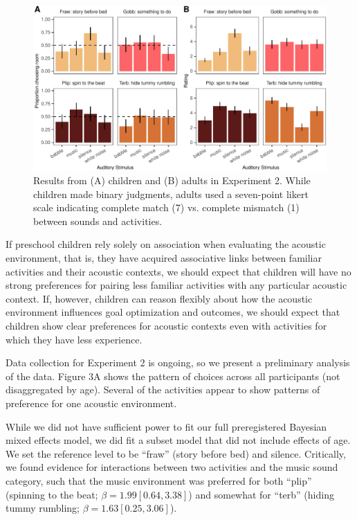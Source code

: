 \documentclass[10pt, letterpaper]{article}
\newenvironment{CodeChunk}{}{}
\begin{document}
\begin{CodeChunk}
\begin{figure}[t]

{\centering \includegraphics{figs/e4-summary-fig-1} 

}

\caption[Results from (A) children and (B) adults in Experiment 2]{Results from (A) children and (B) adults in Experiment 2. While children made binary judgments, adults used a seven-point likert scale indicating complete match (7) vs. complete mismatch (1) between sounds and activities.}\label{fig:e4-summary-fig}
\end{figure}
\end{CodeChunk}

If preschool children rely solely on association when evaluating the
acoustic environment, that is, they have acquired associative links
between familiar activities and their acoustic contexts, we should
expect that children will have no strong preferences for pairing less
familiar activities with any particular acoustic context. If, however,
children can reason flexibly about how the acoustic environment
influences goal optimization and outcomes, we should expect that
children show clear preferences for acoustic contexts even with
activities for which they have less experience.

Data collection for Experiment 2 is ongoing, so we present a preliminary
analysis of the data. Figure 3A shows the pattern of choices across all
participants (not disaggregated by age). Several of the activities
appear to show patterns of preference for one acoustic environment.

While we did not have sufficient power to fit our full preregistered
Bayesian mixed effects model, we did fit a subset model that did not
include effects of age. We set the reference level to be ``fraw'' (story
before bed) and silence. Critically, we found evidence for interactions
between two activities and the music sound category, such that the music
environment was preferred for both ``plip'' (spinning to the beat;
\(\beta = 1.99 [0.64, 3.38]\)) and somewhat for ``terb'' (hiding tummy
rumbling; \(\beta = 1.63 [0.25, 3.06]\)).
\end{document}
